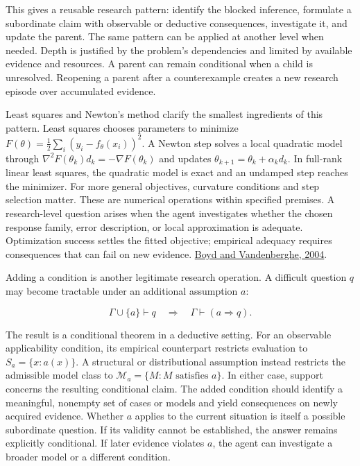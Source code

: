 \documentclass[11pt,a4paper]{article}
\begin{document}
This gives a reusable research pattern: identify the blocked inference, formulate a subordinate claim with observable or deductive consequences, investigate it, and update the parent. The same pattern can be applied at another level when needed. Depth is justified by the problem's dependencies and limited by available evidence and resources. A parent can remain conditional when a child is unresolved. Reopening a parent after a counterexample creates a new research episode over accumulated evidence.


Least squares and Newton's method clarify the smallest ingredients of this pattern. Least squares chooses parameters to minimize \(F(\theta)=\tfrac12\sum_i(y_i-f_\theta(x_i))^2\). A Newton step solves a local quadratic model through \(\nabla^2F(\theta_k)d_k=-\nabla F(\theta_k)\) and updates \(\theta_{k+1}=\theta_k+\alpha_kd_k\). In full-rank linear least squares, the quadratic model is exact and an undamped step reaches the minimizer. For more general objectives, curvature conditions and step selection matter. These are numerical operations within specified premises. A research-level question arises when the agent investigates whether the chosen response family, error description, or local approximation is adequate. Optimization success settles the fitted objective; empirical adequacy requires consequences that can fail on new evidence. \href{https://web.stanford.edu/~boyd/cvxbook/bv_cvxbook.pdf}{Boyd and Vandenberghe, 2004}.


Adding a condition is another legitimate research operation. A difficult question \(q\) may become tractable under an additional assumption \(a\):


\[
\Gamma\cup\{a\}\vdash q
\quad\Longrightarrow\quad
\Gamma\vdash(a\Rightarrow q).
\]


The result is a conditional theorem in a deductive setting. For an observable applicability condition, its empirical counterpart restricts evaluation to \(S_a=\{x:a(x)\}\). A structural or distributional assumption instead restricts the admissible model class to \(\mathcal M_a=\{M:M\text{ satisfies }a\}\). In either case, support concerns the resulting conditional claim. The added condition should identify a meaningful, nonempty set of cases or models and yield consequences on newly acquired evidence. Whether \(a\) applies to the current situation is itself a possible subordinate question. If its validity cannot be established, the answer remains explicitly conditional. If later evidence violates \(a\), the agent can investigate a broader model or a different condition.
\end{document}

